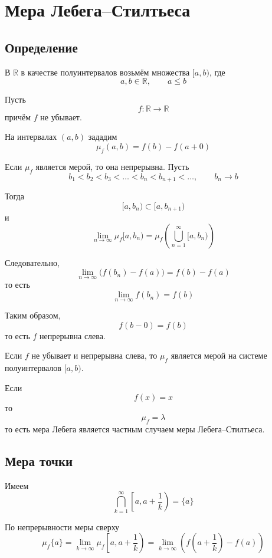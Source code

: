 \documentclass[12pt,a4paper]{article}
\begin{document}
\newpage

\section{Мера Лебега--Стилтьеса}

\subsection{Определение}

В $\mathbb{R}$ в качестве полуинтервалов возьмём множества $[a,b)$, где
\[
    a,b\in\mathbb{R},
    \qquad
    a\leq b
\]

Пусть
\[
    f:\mathbb{R}\to\mathbb{R}
\]
причём $f$ не убывает.

\begin{definition}
    На интервалах $(a,b)$ зададим
    \[
        \mu_f(a,b)=f(b)-f(a+0)
    \]
\end{definition}

Если $\mu_f$ является мерой, то она непрерывна. Пусть
\[
    b_1<b_2<b_3<\ldots<b_n<b_{n+1}<\ldots,
    \qquad
    b_n\to b
\]

Тогда
\[
    [a,b_n)\subset[a,b_{n+1})
\]
и
\[
    \lim_{n\to\infty}\mu_f[a,b_n)
    =
    \mu_f\left(\bigcup_{n=1}^{\infty}[a,b_n)\right)
\]

Следовательно,
\[
    \lim_{n\to\infty}\bigl(f(b_n)-f(a)\bigr)
    =
    f(b)-f(a)
\]
то есть
\[
    \lim_{n\to\infty}f(b_n)=f(b)
\]

Таким образом,
\[
    f(b-0)=f(b)
\]
то есть $f$ непрерывна слева.

\begin{note}
    Если $f$ не убывает и непрерывна слева, то $\mu_f$ является мерой на системе полуинтервалов $[a,b)$.
\end{note}

\begin{note}
    Если
    \[
        f(x)=x
    \]
    то
    \[
        \mu_f=\lambda
    \]
    то есть мера Лебега является частным случаем меры Лебега--Стилтьеса.
\end{note}

\subsection{Мера точки}

Имеем
\[
    \bigcap_{k=1}^{\infty}\left[a,a+\frac{1}{k}\right)=\{a\}
\]

По непрерывности меры сверху
\[
    \mu_f\{a\}
    =
    \lim_{k\to\infty}
    \mu_f\left[a,a+\frac{1}{k}\right)
    =
    \lim_{k\to\infty}
    \left(
    f\left(a+\frac{1}{k}\right)-f(a)
    \right)
\]
\end{document}
